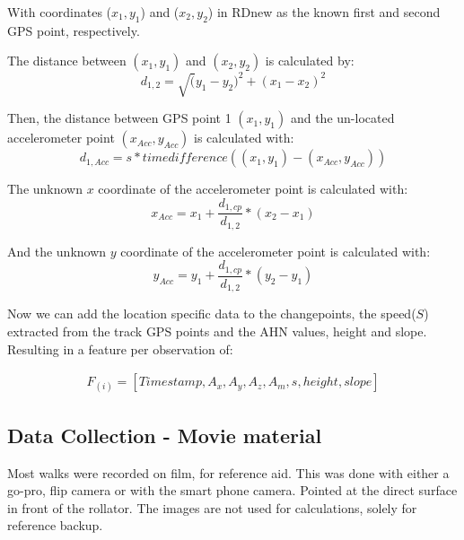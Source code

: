 With coordinates ($x_{1}, y_{1}$) and ($x_{2}, y_{2}$) in RDnew as the known first and second GPS point, respectively. 

The distance between $(x_{1}, y_{1})$ and $(x_{2}, y_{2})$ is calculated by:
\begin{equation}
d_{1,2} = \sqrt (y_{1}-y_{2})^2 + (x_{1}-x_{2})^2 
\end{equation}

Then, the distance between GPS point 1 $(x_{1}, y_{1})$ and the un-located accelerometer point $(x_{Acc}, y_{Acc})$ is calculated with:
\begin{equation}
d_{1,Acc} = s * time difference((x_{1}, y_{1}) - (x_{Acc}, y_{Acc}))
\end{equation}

The unknown $x$ coordinate of the accelerometer point is calculated with:
\begin{equation}
x_{Acc} = x_{1} + \frac{d_{1,cp}}{d_{1,2}} * (x_{2} - x_{1})
\end{equation}

And the unknown $y$ coordinate of the accelerometer point is calculated with:
\begin{equation}
y_{Acc} = y_{1} + \frac{d_{1,cp}}{d_{1,2}} * (y_{2} - y_{1})
\end{equation}

Now we can add the location specific data to the changepoints, the speed($S$) extracted from the track GPS points and the AHN values, height and slope. Resulting in a feature per observation of:

\begin{multline} 
	F_(i) = [ Time stamp, A_{x}, A_{y}, A_{z}, A_{m}, s, height, slope] 
\end{multline}

\subsection{Data Collection - Movie material}
Most walks were recorded on film, for reference aid. This was done with either a go-pro, flip camera or with the smart phone camera. Pointed at the direct surface in front of the rollator. The images are not used for calculations, solely for reference backup. 

